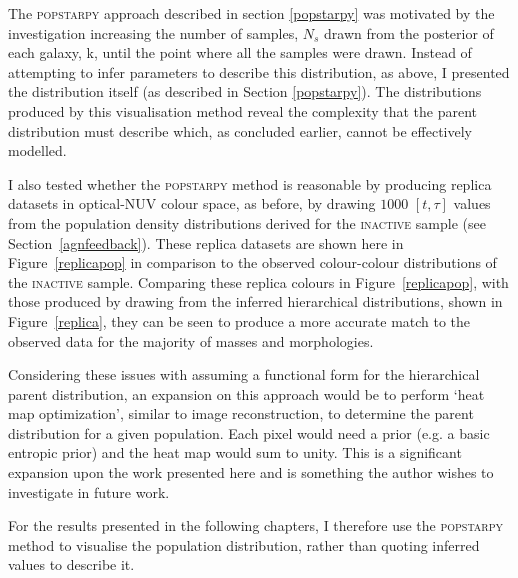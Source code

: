 The \textsc{popstarpy} approach described in section \ref{popstarpy} was motivated by the investigation increasing the number of samples, $N_s$ drawn from the posterior of each galaxy, k, until the point where all the samples were drawn. Instead of attempting to infer parameters to describe this distribution, as above, I presented the distribution itself (as described in Section \ref{popstarpy}).  The distributions produced by this visualisation method reveal the complexity that the parent distribution must describe which, as concluded earlier, cannot be effectively modelled.

I also tested whether the \textsc{popstarpy} method is reasonable by producing replica datasets in optical-NUV colour space, as before, by drawing $1000$ $[t, \tau]$ values from the population density distributions derived for the \textsc{inactive} sample (see Section~\ref{agnfeedback}). These replica datasets are shown here in Figure~\ref{replicapop} in comparison to the observed colour-colour distributions of the \textsc{inactive} sample. Comparing these replica colours in Figure~\ref{replicapop}, with those produced by drawing from the inferred hierarchical distributions, shown in Figure~\ref{replica}, they can be seen to produce a more accurate match to the observed data for the majority of masses and morphologies. 

Considering these issues with assuming a functional form for the hierarchical parent distribution, an expansion on this approach would be to perform `heat map optimization', similar to image reconstruction, to determine the parent distribution for a given population. Each pixel would need a prior (e.g. a basic entropic prior) and the heat map would sum to unity. This is a significant expansion upon the work presented here and is something the author wishes to investigate in future work.

For the results presented in the following chapters, I therefore use the \textsc{popstarpy} method to visualise the population distribution, rather than quoting inferred values to describe it.


